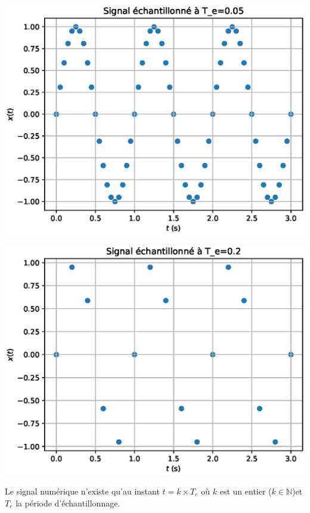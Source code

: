 \documentclass[11pt,a4paper]{article}
\begin{document}
\begin{center}
\begin{minipage}{0.45\linewidth}
\includegraphics[scale=0.5]{sin_num1.eps} 

\end{minipage}\hfill
\begin{minipage}{0.45\linewidth}
\includegraphics[scale=0.5]{sin_num2.eps} 

\end{minipage}
\end{center}
Le signal numérique n'existe qu'au instant $t=k\times T_e$ où $k$ est un entier ($k\in \mathbb{N}$)et $T_e$ la période d'échantillonnage.
\end{document}

